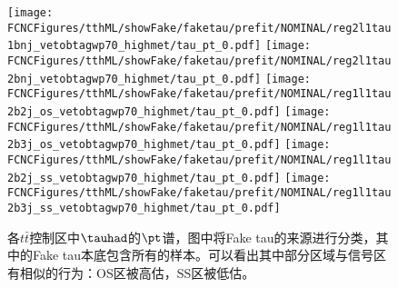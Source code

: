 \begin{figure}[H]
\centering
\texttt{[image: \\FCNCFigures/tthML/showFake/faketau/prefit/NOMINAL/reg2l1tau1bnj\_vetobtagwp70\_highmet/tau\_pt\_0.pdf]}
\texttt{[image: \\FCNCFigures/tthML/showFake/faketau/prefit/NOMINAL/reg2l1tau2bnj\_vetobtagwp70\_highmet/tau\_pt\_0.pdf]}
\texttt{[image: \\FCNCFigures/tthML/showFake/faketau/prefit/NOMINAL/reg1l1tau2b2j\_os\_vetobtagwp70\_highmet/tau\_pt\_0.pdf]}
\texttt{[image: \\FCNCFigures/tthML/showFake/faketau/prefit/NOMINAL/reg1l1tau2b3j\_os\_vetobtagwp70\_highmet/tau\_pt\_0.pdf]}
\texttt{[image: \\FCNCFigures/tthML/showFake/faketau/prefit/NOMINAL/reg1l1tau2b2j\_ss\_vetobtagwp70\_highmet/tau\_pt\_0.pdf]}
\texttt{[image: \\FCNCFigures/tthML/showFake/faketau/prefit/NOMINAL/reg1l1tau2b3j\_ss\_vetobtagwp70\_highmet/tau\_pt\_0.pdf]}
\caption{各$t\bar{t}$控制区中$\tauhad$的$\pt$谱，图中将Fake tau的来源进行分类，其中的Fake tau本底包含所有的样本。可以看出其中部分区域与信号区有相似的行为：OS区被高估，SS区被低估。}
\label{fig:wjet_pt_CR}
\end{figure}
